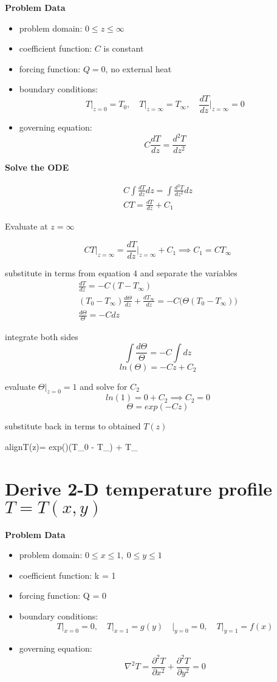 \documentclass[letterpaper, 10pt, oneside]{article}
\newenvironment{dd}[1]{
	\noindent
	\textbf{\normalsize{#1}}
	\hspace{0.1in}
	\small
	\rmfamily
	}
	{\medskip}
\newcommand{\bdd}{\begin{dd}}
\newcommand{\edd}{\end{dd}}
\newcommand{\bi}{\begin{itemize}}
\newcommand{\ei}{\end{itemize}}
\newcommand{\boxedeq}[2]{\begin{empheq}[box={\fboxsep=6pt\fbox}]{align}\label{#1}#2\end{empheq}}
\begin{document}
\begin{dd}{Problem Data}
\begin{itemize}
	\item problem domain: $0 \le z \le \infty$
	\item coefficient function: $C$ is constant
	\item forcing function: $Q = 0$, no external heat
	\item boundary conditions: $$ T \Bigr|_{z=0} = T_0, \quad T\Bigr|_{z=\infty} = T_{\infty}, \quad \frac{dT}{dz}\Bigr|_{z=\infty} = 0$$
	\item governing equation: $$C\frac{d T}{d z}  = \frac{d^2 T}{d z^2}$$
\end{itemize}
\end{dd}

\begin{dd}{Solve the ODE}
\begin{gather*}
	C \int \frac{dT}{dz} dz = \int \frac{d^2T}{dz^2} dz \\
	C T = \frac{dT}{dz} + C_1
\end{gather*}

Evaluate at $z = \infty$

	$$CT\Bigr|_{z=\infty} = \frac{dT}{dz}\Bigr|_{z=\infty} + C_1 \implies C_1 = CT_{\infty}$$

substitute in terms from equation $4$ and separate the variables
\begin{gather*}
	\frac{dT}{dz} = -C(T - T_{\infty}) \\
	(T_0 - T_{\infty})\frac{d\Theta}{dz} + \frac{dT_{\infty}}{dz} = -C\Big(\Theta(T_0 - T_{\infty}) \Big) \\
	\frac{d\Theta}{\Theta} = -C dz
\end{gather*}

integrate both sides
$$	\int \frac{d\Theta}{\Theta} = -C\int dz$$
$$ ln(\Theta) = -Cz + C_2 $$

evaluate $\Theta \Bigr|_{z=0} = 1$ and solve for $C_2$
$$ln(1) = 0 + C_2 \implies C_2 = 0$$
$$ \Theta = exp(-Cz)$$

substitute back in terms to obtained $T(z)$

\boxedeq{1}{T(z)= exp\left(\right)(T_0 - T_{\infty}) + T_{\infty}}

\end{dd}
\section{Derive 2-D temperature profile $T = T(x,y)$}
\bdd{Problem Data} \bi
	\item problem domain: $0\le x \le 1, \ 0 \le y \le 1$
	\item coefficient function: k = 1
	\item forcing function: Q = 0
	\item boundary conditions: 
		$$T \Bigr|_{x=0}=0, \quad T \Bigr|_{x=1}=g(y) \quad \Bigr|_{y=0}=0, \quad T \Bigr|_{y=1}=f(x) $$
	\item governing equation:
		$$\nabla^2 T = \frac{\partial^2 T}{\partial x^2} + \frac{\partial^2 T}{\partial y^2}=0$$
\ei \edd
\end{document}
